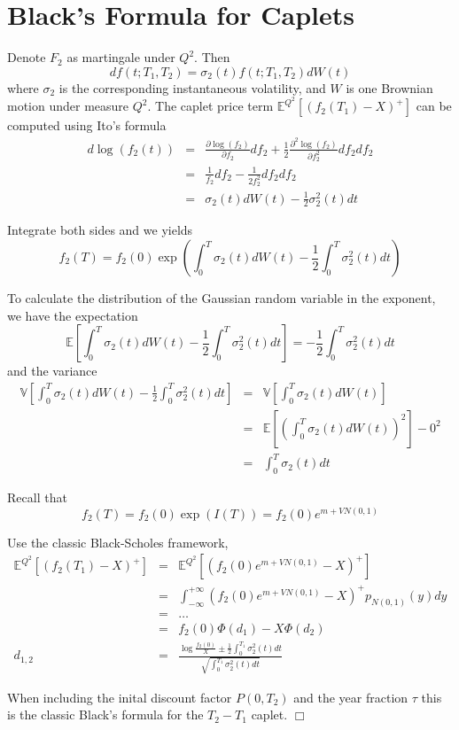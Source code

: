 \chapter{Black's Formula for Caplets}

Denote $F_2$ as martingale under $Q^2$. Then
$$
df(t;T_1,T_2) = \sigma_2(t)f(t;T_1,T_2)dW(t)
$$
where $\sigma_2$ is the corresponding instantaneous volatility, and $W$ is one Brownian motion under measure $Q^2$. The caplet price term $\mathbb{E}^{Q^2}[(f_2(T_1)-X)^+]$ can be computed using Ito's formula
\begin{eqnarray*}
d\log(f_2(t)) &=& \frac{\partial \log(f_2)}{\partial f_2} df_2 + \frac{1}{2} \frac{\partial^2 \log(f_2)}{\partial f_2^2} d f_2 d f_2 \\
              &=& \frac{1}{f_2} df_2 - \frac{1}{2 f_2^2} d f_2 df_2 \\
              &=& \sigma_2(t) dW(t) -\frac{1}{2} \sigma_2^2 (t) dt
\end{eqnarray*}  

Integrate both sides and we yields
$$
f_2(T) = f_2(0) \exp\left( \int_0^T \sigma_2(t) dW(t) - \frac{1}{2}\int_0^T \sigma_2^2(t) dt \right)
$$

To calculate the distribution of the Gaussian random variable in the exponent, we have the expectation
$$
\mathbb{E}\left[ \int_0^T \sigma_2(t) dW(t) - \frac{1}{2}\int_0^T \sigma_2^2(t) dt \right] = -\frac{1}{2} \int_0^T \sigma_2^2(t) dt
$$ 
and the variance
\begin{eqnarray*}
\mathbb{V}\left[ \int_0^T \sigma_2(t) dW(t) - \frac{1}{2}\int_0^T \sigma_2^2(t) dt \right] &=& \mathbb{V}\left[ \int_0^T \sigma_2(t) dW(t) \right] \\
   &=& \mathbb{E}\left[ \left( \int_0^T \sigma_2(t) dW(t) \right)^2 \right] - 0^2 \\
   &=& \int_0^T \sigma_2(t) dt
\end{eqnarray*}  

Recall that 
$$
f_2(T) = f_2(0) \exp(I(T)) = f_2(0) e^{m+V N(0,1)}
$$

Use the classic Black-Scholes framework, 
\begin{eqnarray*}
\mathbb{E}^{Q^2}[(f_2(T_1)-X)^+] &=& \mathbb{E}^{Q^2}[(f_2(0) e^{m+V N(0,1)}-X)^+] \\
                                 &=& \int_{-\infty}^{+\infty} (f_2(0) e^{m+V N(0,1)}-X)^+ p_{N(0,1)}(y) dy \\
                                 &=& \ldots \\
                                 &=& f_2(0) \Phi(d_1) - X\Phi(d_2) \\
                     d_{1,2}     &=& \frac{\log\frac{f_2(0)}{X} \pm \frac{1}{2} \int_0^{T_1} \sigma_2^2(t)dt}{\sqrt{\int_0^{T_1}\sigma_2^2(t)dt }}
\end{eqnarray*}

When including the inital discount factor $P(0,T_2)$ and the year fraction $\tau$ this is the classic Black's formula for the $T_2 - T_1$ caplet. $\Box$